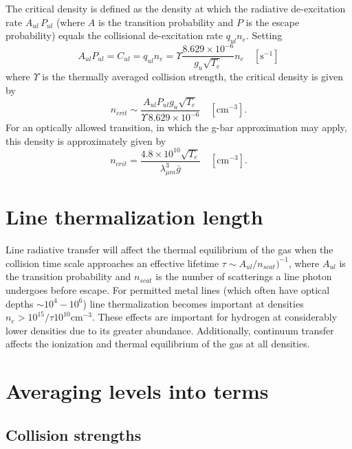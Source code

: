 The critical density is defined as the density at which the radiative
de-excitation rate $A_{ul}\, P_{ul}$ (where $A$ is the transition
probability and $P$
is the escape probability) equals the collisional de-excitation rate
$q_{ul}n_e$.
Setting
\begin{equation}
{A_{ul}}{P_{ul}} = {C_{ul}} = {q_{ul}}{n_e} = \Upsilon \frac{{8.629 \times
{{10}^{ - 6}}}}{{{g_u}\sqrt {{T_e}} }}{n_e}\quad
  [\mathrm{s}^{-1}]
\end{equation}
where $\Upsilon$ is the thermally averaged collision strength,
the critical density
is given by
\begin{equation}
{n_{crit}} \sim \frac{{{A_{ul}}{P_{ul}}{g_u}\sqrt {{T_e}} }}{{\Upsilon
\,8.629 \times {{10}^{ - 6}}}}\quad
  [\mathrm{cm}^{-3}].
\end{equation}
For an optically allowed transition, in which the g-bar approximation may
apply, this density is approximately given by
\begin{equation}
{n_{crit}} = \frac{{4.8 \times {{10}^{10}}\sqrt {{T_e}} }}{{\lambda _{\mu
m}^3\bar g}}\quad
[\mathrm{cm}^{-3}].
\end{equation}

\section{Line thermalization length }

Line radiative transfer will affect the thermal equilibrium of the gas
when the collision time scale approaches an effective lifetime $\tau\sim
A_{ul} /n_{scat} )^{-1}$, where $A_{ul}$ is the transition probability and
$n_{scat}$ is the number
of scatterings a line photon undergoes before escape.
For permitted metal
lines (which often have optical depths  $\sim10^4 - 10^6$) line thermalization
becomes important at densities $n_e >10^{15} / \tau 10^{10} \mathrm{cm}^{-3}$.  These effects are
important for hydrogen at considerably lower densities due to its greater
abundance.  Additionally, continuum transfer affects the ionization and
thermal equilibrium of the gas at all densities.

\section{Averaging levels into terms  }

\subsection{Collision strengths }

